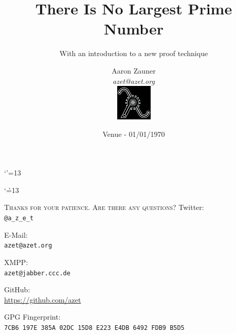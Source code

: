 \documentclass[hyperref={draft}, aspectratio=169, compress, 10pt]{beamer}
\title{There Is No Largest Prime Number}
\subtitle{With an introduction to a new proof technique}
\author[Aaron Zauner]{Aaron Zauner\\
        \textit{azet@azet.org}\\
        \vspace{10px}
        \includegraphics[height=65px,width=65px]{lambda}
       }
\institute{lambda.co.at:\\Highly-Available, Scalable \& Secure Distributed Systems}
\date{Venue - 01/01/1970}
\begin{document}
\makeatletter
\let \@sverbatim \@verbatim
\def \@verbatim {\@sverbatim \verbatimplus}
{\catcode`'=13 \gdef \verbatimplus{\catcode`'=13 \chardef '=13 }} 
\makeatother

\makeatletter
{\catcode`\`=13
\xdef\@verbatim{\unexpanded\expandafter{\@verbatim}\chardef\noexpand`=18 }
}
\makeatother

{

\begin{frame}
  \titlepage
\end{frame}

}
\addtocounter{framenumber}{-1}

{

\begin{frame}
  \tableofcontents
\end{frame}

}
\addtocounter{framenumber}{-1}





\begin{frame}
  \begin{center}
    \textsc{Thanks for your patience. Are there any questions?}
    \vfill
    Twitter:\\
    \texttt{@a\_z\_e\_t}

    \vfill
    E-Mail:\\
    \texttt{azet@azet.org}

    \vfill
    XMPP:\\
    \texttt{azet@jabber.ccc.de}

    \vfill
    GitHub:\\
    \url{https://github.com/azet}

    \vfill
    GPG Fingerprint:\\
    \texttt{7CB6 197E 385A 02DC 15D8 E223 E4DB 6492 FDB9 B5D5}
  \end{center}
\end{frame}


\end{document}
